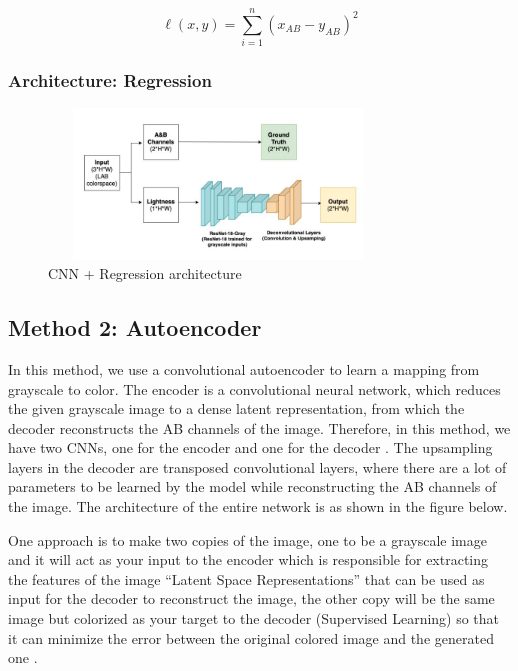 \documentclass{article}
\begin{document}
{\Large
\begin{equation}
    \ell(x,y) = \sum_{i=1}^{n} \left( x_{AB} - y_{AB} \right)^2
\end{equation}}


\subsubsection{Architecture: Regression}
\begin{figure}[htbp!]
    \centering
        \includegraphics[width=9cm, height=4cm]{reg.jpg}
        \caption{CNN + Regression architecture}
    \end{figure}
    

\subsection{Method 2: Autoencoder}
In this method, we use a convolutional autoencoder to learn a mapping from grayscale to color.
The encoder is a convolutional neural network, which reduces the given grayscale image to a dense latent representation, from which the decoder reconstructs the AB channels of the image.
Therefore, in this method, we have two CNNs, one for the encoder and one for the decoder \cite{2}.
The upsampling layers in the decoder are transposed convolutional layers, where there are a lot of parameters to be learned by the model while reconstructing the AB channels of the image.
The architecture of the entire network is as shown in the figure below. 


One approach is to make two copies of the image, one to be a grayscale image and it will act as your input to the encoder which is responsible for extracting the features of the image 
“Latent Space Representations” that can be used as input for the decoder to reconstruct the image, the other copy will be the same image but colorized as your target to the decoder (Supervised Learning) so that it can minimize the error between the original colored image and the generated one \cite{4}.
\end{document}
